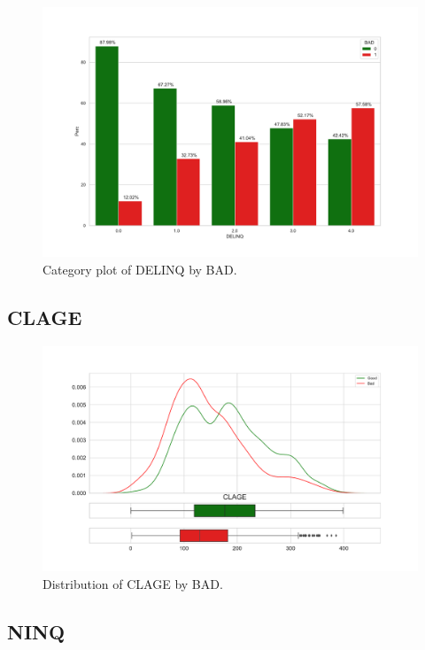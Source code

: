 \begin{figure}[!ht]
	\centering
	\includegraphics[scale=0.40]{figs/delinq_cat.pdf}
	\caption{Category plot of DELINQ by BAD. \label{delinq_cat}}
\end{figure}

\subsection*{CLAGE}

\begin{figure}[!ht]
	\centering
	\includegraphics[scale=0.40]{figs/clage_dist.pdf}
	\caption{Distribution of CLAGE by BAD. \label{clage_dist}}
\end{figure}

\subsection*{NINQ}

